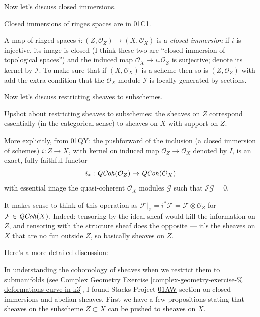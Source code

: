 \medskip\noindent
Now let's discuss closed immersions.

\noindent
Closed immersions of ringes spaces are in
\href{https://stacks.math.columbia.edu/tag/%
01C1}{01C1}.

\begin{definition}
\label{definition-closed-immersion}
A map of ringed spaces
$i:(Z,\mathcal{O}_Z) \to (X,\mathcal{O}_X)$
is a {\it closed immersion}
if $i$ is injective,
its image is closed (I think these two are
``closed immersion of topological spaces'')
and the induced map $\mathcal{O}_X \to
i_*\mathcal{O}_Z$
is surjective; denote its kernel by
$\mathcal{I}$.
To make sure that if $(X,\mathcal{O}_X)$ is a
scheme
then so is $(Z,\mathcal{O}_Z)$ with add the
extra condition
that the $\mathcal{O}_X$-module $\mathcal{I}$
is
locally generated by sections.
\end{definition}

\medskip\noindent
Now let's discuss restricting sheaves to
subschemes.

Upshot about restricting sheaves to
subschemes:
the sheaves on $Z$ correspond essentially
(in the categorical sense)
to sheaves on $X$ with support on $Z$.

More explicitly, from
\href{https://stacks.math.columbia.edu/tag/%
01QY}{01QY}:
the pushforward of the inclusion (a closed
immersion of schemes)
$i:Z \to X$, with kernel on induced map
$\mathcal{O}_Z \to \mathcal{O}_X$
denoted by $I$, is an exact, fully faithful
functor
$$
i_*:\mathit{QCoh}(\mathcal{O}_Z) \to
\mathit{QCoh}(\mathcal{O}_X)
$$
with essential image the quasi-coherent
$\mathcal{O}_X$ modules
$\mathcal{G}$ such that
$\mathcal{I}\mathcal{G}=0$.

It makes sense to think of this operation as
$\mathcal{F}|_Z=i^*\mathcal{F}=\mathcal{F}
\otimes\mathcal{O}_Z$
for $\mathcal{F}\in\mathit{QCoh}(X)$.
Indeed: tensoring by the ideal sheaf would
kill the information on $Z$,
and tensoring with the structure sheaf does
the opposite
--- it's the sheaves on $X$ that are no fun
outside $Z$,
so basically sheaves on $Z$.

\medskip\noindent
Here's a more detailed discussion:

In understanding the cohomology of sheaves
when
we restrict them to submanifolds (see Complex
Geometry
Exercise
\ref{complex-geometry-exercise-%
deformations-curve-in-k3},
I found Stacks Project
\href{https://stacks.math.columbia.edu/tag/%
01AW}{01AW}
section on closed immersions and abelian
sheaves.
First we have a few propositions stating that
sheaves on the subscheme $Z \subset X$ can be
pushed
to sheaves on $X$.

